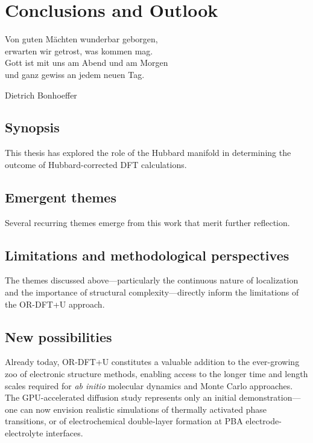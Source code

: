 \chapter{Conclusions and Outlook}
\label{cha:conclusions}
    \epigraph{%
    Von guten Mächten wunderbar geborgen,\\
    erwarten wir getrost, was kommen mag.\\
    Gott ist mit uns am Abend und am Morgen\\
    und ganz gewiss an jedem neuen Tag.}
    {Dietrich Bonhoeffer}


\section{Synopsis}
    \label{sec:concl-synopsins}
    \noindent This thesis has explored the role of the Hubbard manifold in determining the outcome of Hubbard-corrected \ac{DFT} calculations.

\section{Emergent themes}
    \label{sec:concl-themes}
    Several recurring themes emerge from this work that merit further reflection.
\section[Limitations and perspectives]{Limitations and methodological perspectives}
    \label{sec:concl-limitations}
    The themes discussed above---particularly the continuous nature of localization and the importance of structural complexity---directly inform the limitations of the OR-DFT+U approach.
\section{New possibilities}
    \label{sec:concl-possibilities}
    Already today, OR-DFT+U constitutes a valuable addition to the ever-growing zoo of electronic structure methods, enabling access to the longer time and length scales required for \textit{ab initio} molecular dynamics and Monte Carlo approaches.
    The \ac{GPU}-accelerated diffusion study represents only an initial demonstration---one can now envision realistic simulations of thermally activated phase transitions, or of electrochemical double-layer formation at PBA electrode-electrolyte interfaces.
